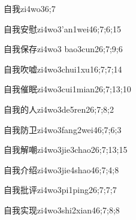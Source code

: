 \begin{verbete}{自我}{zi4wo3}{6;7}
\end{verbete}

\begin{verbete}{自我安慰}{zi4wo3'an1wei4}{6;7;6;15}
\end{verbete}

\begin{verbete}{自我保存}{zi4wo3 bao3cun2}{6;7;9;6}
\end{verbete}

\begin{verbete}{自我吹嘘}{zi4wo3chui1xu1}{6;7;7;14}
\end{verbete}

\begin{verbete}{自我催眠}{zi4wo3cui1mian2}{6;7;13;10}
\end{verbete}

\begin{verbete}{自我的人}{zi4wo3de5ren2}{6;7;8;2}
\end{verbete}

\begin{verbete}{自我防卫}{zi4wo3fang2wei4}{6;7;6;3}
\end{verbete}

\begin{verbete}{自我解嘲}{zi4wo3jie3chao2}{6;7;13;15}
\end{verbete}

\begin{verbete}{自我介绍}{zi4wo3jie4shao4}{6;7;4;8}
\end{verbete}

\begin{verbete}{自我批评}{zi4wo3pi1ping2}{6;7;7;7}
\end{verbete}

\begin{verbete}{自我实现}{zi4wo3shi2xian4}{6;7;8;8}
\end{verbete}

